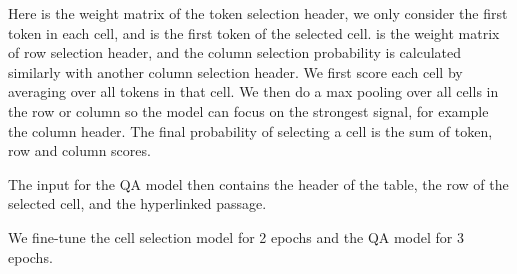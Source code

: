 \documentclass[11pt]{article}
\begin{document}
Here  is the weight matrix of the token selection header, we only consider the first token in each cell, and  is the first token of the selected cell.  is the weight matrix of row selection header, and the column selection probability is calculated similarly with another column selection header. We first score each cell by averaging over all tokens in that cell. We then do a max pooling over all cells in the row or column so the model can focus on the strongest signal, for example the column header. The final probability of selecting a cell is the sum of token, row and column scores.

The input for the QA model then contains the header of the table, the row of the selected cell, and the hyperlinked passage.

We fine-tune the cell selection model for 2 epochs and the QA model for 3 epochs.
\end{document}
